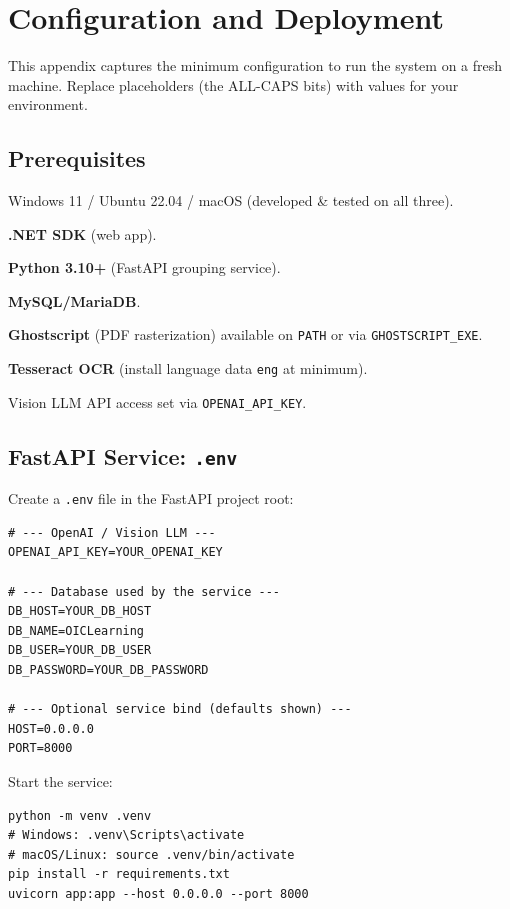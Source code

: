 \documentclass[ms,twoside,print]{nuthesis}
\begin{document}
\chapter{Configuration and Deployment}\label{app:config}

This appendix captures the minimum configuration to run the system on a fresh machine.
Replace placeholders (the ALL-CAPS bits) with values for your environment.

\lstset{basicstyle=\ttfamily\footnotesize,breaklines=true,columns=fullflexible}

\section{Prerequisites}
\begin{compactitem}
  \item Windows 11 / Ubuntu 22.04 / macOS (developed \& tested on all three).
  \item \textbf{.NET SDK} (web app).
  \item \textbf{Python 3.10+} (FastAPI grouping service).
  \item \textbf{MySQL/MariaDB}.
  \item \textbf{Ghostscript} (PDF rasterization) available on \texttt{PATH} or via \texttt{GHOSTSCRIPT\_EXE}.
  \item \textbf{Tesseract OCR} (install language data \texttt{eng} at minimum).
  \item Vision LLM API access set via \texttt{OPENAI\_API\_KEY}.
\end{compactitem}

\section{FastAPI Service: \texttt{.env}}
Create a \texttt{.env} file in the FastAPI project root:
\begin{lstlisting}
# --- OpenAI / Vision LLM ---
OPENAI_API_KEY=YOUR_OPENAI_KEY

# --- Database used by the service ---
DB_HOST=YOUR_DB_HOST
DB_NAME=OICLearning
DB_USER=YOUR_DB_USER
DB_PASSWORD=YOUR_DB_PASSWORD

# --- Optional service bind (defaults shown) ---
HOST=0.0.0.0
PORT=8000
\end{lstlisting}

\noindent Start the service:
\begin{lstlisting}
python -m venv .venv
# Windows: .venv\Scripts\activate
# macOS/Linux: source .venv/bin/activate
pip install -r requirements.txt
uvicorn app:app --host 0.0.0.0 --port 8000
\end{lstlisting}
\end{document}
